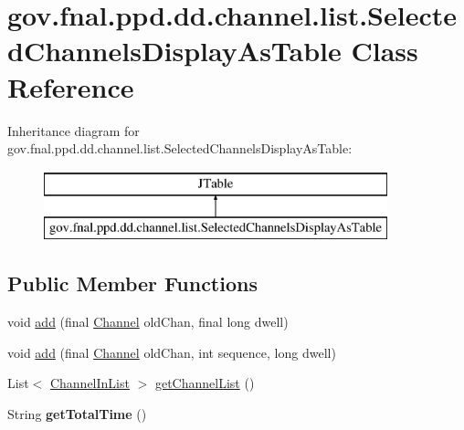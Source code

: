 \hypertarget{classgov_1_1fnal_1_1ppd_1_1dd_1_1channel_1_1list_1_1SelectedChannelsDisplayAsTable}{\section{gov.\-fnal.\-ppd.\-dd.\-channel.\-list.\-Selected\-Channels\-Display\-As\-Table Class Reference}
\label{classgov_1_1fnal_1_1ppd_1_1dd_1_1channel_1_1list_1_1SelectedChannelsDisplayAsTable}
}
Inheritance diagram for gov.\-fnal.\-ppd.\-dd.\-channel.\-list.\-Selected\-Channels\-Display\-As\-Table\-:\begin{figure}[H]
\begin{center}
\leavevmode
\includegraphics[height=2.000000cm]{classgov_1_1fnal_1_1ppd_1_1dd_1_1channel_1_1list_1_1SelectedChannelsDisplayAsTable}
\end{center}
\end{figure}
\subsection*{Public Member Functions}
\begin{DoxyCompactItemize}
\item 
void \hyperlink{classgov_1_1fnal_1_1ppd_1_1dd_1_1channel_1_1list_1_1SelectedChannelsDisplayAsTable_ab0ffb7d55ba467934f72598f02c87301}{add} (final \hyperlink{interfacegov_1_1fnal_1_1ppd_1_1dd_1_1signage_1_1Channel}{Channel} old\-Chan, final long dwell)
\item 
void \hyperlink{classgov_1_1fnal_1_1ppd_1_1dd_1_1channel_1_1list_1_1SelectedChannelsDisplayAsTable_a26e022a0c56496d6b4a99f51a4cc9526}{add} (final \hyperlink{interfacegov_1_1fnal_1_1ppd_1_1dd_1_1signage_1_1Channel}{Channel} old\-Chan, int sequence, long dwell)
\item 
List$<$ \hyperlink{classgov_1_1fnal_1_1ppd_1_1dd_1_1channel_1_1ChannelInList}{Channel\-In\-List} $>$ \hyperlink{classgov_1_1fnal_1_1ppd_1_1dd_1_1channel_1_1list_1_1SelectedChannelsDisplayAsTable_a711f34ff09b13ade321d6cd4e03569bf}{get\-Channel\-List} ()
\item 
\hypertarget{classgov_1_1fnal_1_1ppd_1_1dd_1_1channel_1_1list_1_1SelectedChannelsDisplayAsTable_ac1880f75ac14d29c4d005aad5212acb3}{String {\bfseries get\-Total\-Time} ()}\label{classgov_1_1fnal_1_1ppd_1_1dd_1_1channel_1_1list_1_1SelectedChannelsDisplayAsTable_ac1880f75ac14d29c4d005aad5212acb3}

\end{DoxyCompactItemize}


